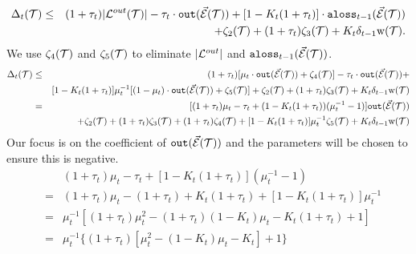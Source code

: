\documentclass{acmsmall}
\newcommand{\cE}{{\cal E}}
\newcommand{\cL}{{\cal L}}
\newcommand{\cT}{{\cal T}}
\newcommand{\aloss}{{\tt aloss}}
\newcommand{\outside}{{\tt out}}
\newcommand{\kappaest}{\widehat{\kappa}}
\newcommand{\width}{{\bf {\rm  w}}}
\newcommand{\errorterm}{\zeta}
\begin{document}

\begin{eqnarray*}
\Delta_t(\cT) & \leq &(1+\tau_t)|\cL^{out}(\cT)| -\tau_t \cdot \outside(\vec{\cE}(\cT)) + [1-K_t(1+\tau_t)]\cdot\aloss_{t-1}(\vec{\cE}(\cT))\\
&& +\errorterm_2(\cT)+(1+\tau_t)\errorterm_3(\cT)+K_t\delta_{t-1} \width(\cT). 
\end{eqnarray*}
%
We use $\errorterm_4(\cT)$ and $\errorterm_5(\cT)$ to eliminate $|\cL^{out}|$ and $\aloss_{t-1}(\vec{\cE}(\cT))$.
%
\begin{eqnarray}
\Delta_t(\cT) & \leq &(1+\tau_t)[\mu_t\cdot\outside(\vec{\cE}(\cT)) + \errorterm_4(\cT)] -\tau_t \cdot \outside(\vec{\cE}(\cT)) + \nonumber \\
&&[1-K_t(1+\tau_t)]\mu^{-1}_t[(1-\mu_t)\cdot\outside(\vec{\cE}(\cT)) + \errorterm_5(\cT)]
 +\errorterm_2(\cT)+(1+\tau_t)\errorterm_3(\cT)+K_t\delta_{t-1} \width(\cT) \nonumber \\
& = & [(1+\tau_t)\mu_t - \tau_t + (1-K_t(1+\tau_t))(\mu^{-1}_t - 1)] \outside(\vec{\cE}(\cT)) \nonumber \\
& & +\errorterm_2(\cT)+(1+\tau_t)\errorterm_3(\cT) + (1+\tau_t)\errorterm_4(\cT) + [1-K_t(1+\tau_t)]\mu^{-1}_t \errorterm_5(\cT) + K_t\delta_{t-1} \width(\cT) \label{eq:errors}
\end{eqnarray}
%
Our focus is on the coefficient of $\outside(\vec{\cE}(\cT))$ and the parameters will be chosen to ensure
this is negative.
%
\begin{eqnarray*}
& & (1+\tau_t)\mu_t - \tau_t + [1-K_t(1+\tau_t)](\mu^{-1}_t - 1) \\
& = & (1+\tau_t)\mu_t - (1+\tau_t) + K_t(1+\tau_t) + [1-K_t(1+\tau_t)]\mu^{-1}_t \\
& = & \mu^{-1}_t[ (1+\tau_t)\mu^2_t - (1+\tau_t)(1-K_t) \mu_t - K_t(1+\tau_t) + 1] \\
& = & \mu^{-1}_t\{ (1+\tau_t)[\mu^2_t - (1-K_t)\mu_t - K_t] + 1\}
\end{eqnarray*}
\end{document}
